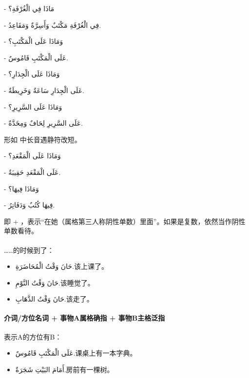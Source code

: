 \begin{Arabic}
    - مَاذَا فِي الْغُرْفَةِ؟

    - فِي الْغُرْفَةِ مَكْتَبٌ وَأَسِرَّةٌ وَمَقَاعِدُ.

    - وَمَاذَا عَلَى الْمَكْتَبِ؟

    - عَلَى الْمَكْتَبِ قَامُوسٌ.

    - وَمَاذَا عَلَى الْجِدَارِ؟

    - عَلَى الْجِدَارِ سَاعَةٌ وَخَرِيطَةٌ.

    - وَمَاذَا عَلَى السَّرِيرِ؟

    - عَلَى السَّرِيرِ لِحَافٌ وَمِخَدَّةٌ.

\end{Arabic}

\begin{attention}
    形如  中长音遇静符改短。
\end{attention}

\begin{Arabic}
    - وَمَاذَا عَلَى الْمَقْعَدِ؟

    - عَلَى الْمَقْعَدِ حَقِيبَةٌ.

    - وَمَاذَا فِيهَا؟

    - فِيهَا كُتُبٌ وَدَفَاتِرُ.
\end{Arabic}

\begin{attention}
     即  +  ，表示``在她（属格第三人称阴性单数）里面''。如果是复数，依然当作阴性单数看待。
\end{attention}

\paragraph{} ……的时候到了：
\begin{itemize}
    \item \ac{حَانَ وَقْتُ الْمُحَاضَرَةِ.}{该上课了。}
    \item \ac{حَانَ وَقْتُ النَّوْمِ.}{该睡觉了。}
    \item \ac{حَانَ وَقْتُ الذَّهَابِ.}{该走了。}
\end{itemize}

\paragraph{介词/方位名词 + 事物A属格确指 + 事物B主格泛指} 表示A的方位有B：
\begin{itemize}
    \item \ac{عَلَى الْمَكْتَبِ قَامُوسٌ.}{课桌上有一本字典。}
    \item \ac{أَمَامَ البَيْتِ شَجَرَةٌ.}{房前有一棵树。}
\end{itemize}

